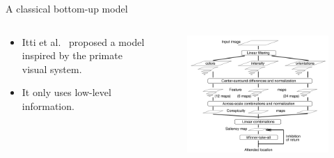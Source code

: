 \documentclass[xcolor=pdftex,dvipsnames,table,mathserif]{beamer}
\newcommand{\source}[1]{\begin{textblock*}{4cm}(8.7cm,8.6cm)
    \begin{beamercolorbox}[ht=0.5cm,right]{framesource}
      \usebeamerfont{framesource}\usebeamercolor[fg]{framesource} Credits: {#1}
    \end{beamercolorbox}
\end{textblock*}}
\begin{document}
\begin{frame}{A classical bottom-up model}

\begin{columns}
  \begin{column}{.4\textwidth}
\begin{itemize}
\item Itti et al.~\cite{itti_model_1998} proposed a model inspired by the primate visual system.
\item It only uses low-level information.
\end{itemize}


  \end{column}

  \begin{column}{.6\textwidth}
\begin{figure}[ht]
  \centering
  \includegraphics[width=\textwidth]{visual_attention_model_itti}
\end{figure}

  \end{column}
\end{columns}



\end{frame}


\end{document}
